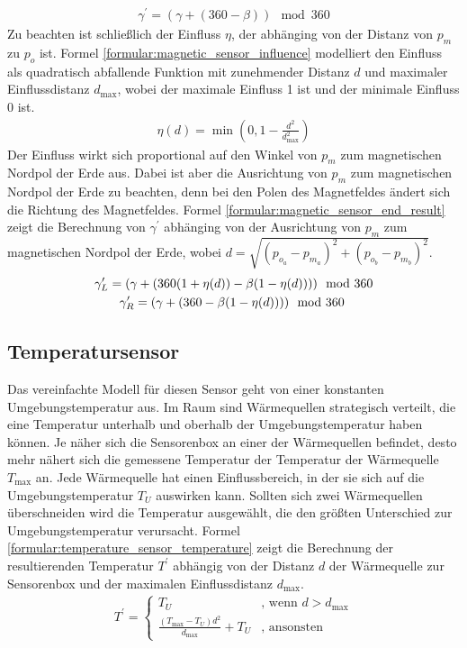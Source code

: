 \begin{align}
    \label{formular:magnetic_sensor_new_heading}
    \gamma^{\prime} = (\gamma + (360 - \beta))\mod 360
\end{align}
\newpage
Zu beachten ist schließlich der Einfluss $\eta$, der abhänging von der Distanz von $p_{m}$ zu $p_{o}$ ist.
Formel \ref{formular:magnetic_sensor_influence} modelliert den Einfluss als quadratisch abfallende Funktion mit zunehmender Distanz $d$ und maximaler Einflussdistanz $d_{\max}$,
wobei der maximale Einfluss 1 ist und der minimale Einfluss 0 ist.
\begin{align}
    \label{formular:magnetic_sensor_influence}
    \eta(d) = \min(0, 1 - \frac{d^2}{d_{\max}^2})
\end{align}
Der Einfluss wirkt sich proportional auf den Winkel von $p_{m}$ zum magnetischen Nordpol der Erde aus.
Dabei ist aber die Ausrichtung von $p_{m}$ zum magnetischen Nordpol der Erde zu beachten, denn bei den Polen des Magnetfeldes ändert sich die Richtung des Magnetfeldes.
Formel \ref{formular:magnetic_sensor_end_result} zeigt die Berechnung von $\gamma^{\prime}$ abhänging von der Ausrichtung von $p_{m}$ zum magnetischen Nordpol der Erde,
wobei $d = \sqrt{(p_{o_a} - p_{m_a})^2 + (p_{o_b} - p_{m_b})^2}$.
\begin{align}
    \label{formular:magnetic_sensor_end_result}
    \gamma^{\prime}_L = (\gamma + (360(1 + \eta(d)) - \beta(1 - \eta(d))))\mod 360 \\\nonumber
    \gamma^{\prime}_R = (\gamma + (360 - \beta(1 - \eta(d))))\mod 360 \hspace{0.8cm}
\end{align}

\subsection{Temperatursensor}
Das vereinfachte Modell für diesen Sensor geht von einer konstanten Umgebungstemperatur aus.
Im Raum sind Wärmequellen strategisch verteilt, die eine Temperatur unterhalb und oberhalb der Umgebungstemperatur haben können.
Je näher sich die Sensorenbox an einer der Wärmequellen befindet, desto mehr nähert sich die gemessene Temperatur der Temperatur der Wärmequelle $T_{\max}$ an.
\newline
\newline
Jede Wärmequelle hat einen Einflussbereich, in der sie sich auf die Umgebungstemperatur $T_U$ auswirken kann.
Sollten sich zwei Wärmequellen überschneiden wird die Temperatur ausgewählt, die den größten Unterschied zur Umgebungstemperatur verursacht.
Formel \ref{formular:temperature_sensor_temperature} zeigt die Berechnung der resultierenden Temperatur $T^{\prime}$ abhängig von der Distanz $d$ der
Wärmequelle zur Sensorenbox und der maximalen Einflussdistanz $d_{\max}$.
\begin{align}
    \label{formular:temperature_sensor_temperature}
    T^{\prime} = \begin{cases}
                     T_U & \text{, wenn } d > d_{\max} \\
                     \frac{(T_{\max} - T_U)d^2}{d_{\max}} + T_U & \text{, ansonsten}
    \end{cases}
\end{align}

